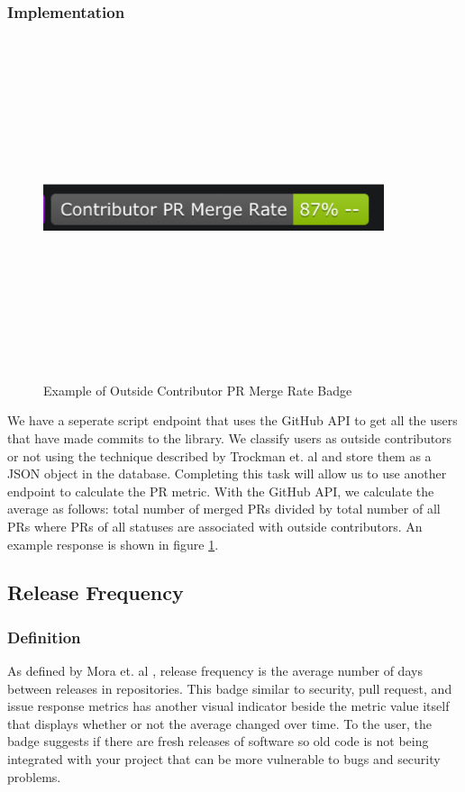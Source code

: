 \documentclass[12pt, letterpaper]{article}
\begin{document}
\subsubsection{Implementation}

\begin{figure}[!htb]
    \centerline{
        \includegraphics[width=10cm,height=10cm,keepaspectratio=true]{prbadge}
    }
    \caption{
        Example of Outside Contributor PR Merge Rate Badge 
    }
    \label{prbadge}
\end{figure}

We have a seperate script endpoint that uses the GitHub \cite{github} API to get all the users
that have made commits to the library. We classify users as outside contributors or not using
the technique described by Trockman et. al \cite{githubbadges} and store them as a JSON object in the database.
Completing this task will allow us to use another endpoint to calculate the PR metric.
With the GitHub \cite{github} API, we calculate
the average as follows: total number of merged PRs divided by total number of all PRs where 
PRs of all statuses are associated with outside contributors. An example response is shown in figure \ref{prbadge}.


\subsection{Release Frequency}
\subsubsection{Definition}
As defined by Mora et. al \cite{metrics}, release frequency is the average number of days between
releases in repositories. This badge similar to security, pull request, and issue response metrics has 
another visual indicator beside the metric value itself that displays whether or not the average changed over time. 
To the user, the badge suggests if there are fresh releases of software so old code is not being integrated with your
project that can be more vulnerable to bugs and security problems.
\end{document}
